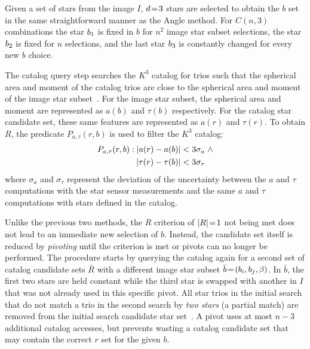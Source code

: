 Given a set of stars from the image $I$, $d \!=\! 3$ stars are selected to obtain the $b$ set in the same
straightforward manner as the Angle method.
For $C(n, 3)$ combinations the star $b_1$ is fixed in $b$ for $n^2$ image star subset selections,
the star $b_2$ is fixed for $n$ selections, and the last star $b_3$ is constantly changed for
every new $b$ choice.

The catalog query step searches the $K^3$ catalog for trios such that the spherical area and moment of the catalog trios
are close to the spherical area and moment of the image star subset~\cite{coleAndCrassidis:sphericalTriangleMethod}.
For the image star subset, the spherical area and moment are represented as $a(b)$ and $\tau(b)$ respectively.
For the catalog star candidate set, these same features are represented as $a(r)$ and $\tau(r)$.
To obtain $R$, the predicate $P_{a, \tau}(r, b)$ is used to filter the $K^3$ catalog:
\begin{equation}
    \begin{aligned}
        P_{a, \tau}(r, b) : \left|  a(r) - a(b) \right| &< 3\sigma_{a}
        \ \land \\ \left| \tau(r) - \tau(b) \right| &< 3\sigma_{\tau}
    \end{aligned}
\end{equation}
where $\sigma_{a}$ and $\sigma_{\tau}$ represent the deviation of the uncertainty between the $a$ and $\tau$
computations with the star sensor measurements and the same $a$ and $\tau$ computations with stars defined in the
catalog.

Unlike the previous two methods, the $R$ criterion of $|R| \!=\! 1$ not being met does not lead to an immediate new
selection of $b$.
Instead, the candidate set itself is reduced by \textit{pivoting} until the criterion is met or pivots can no longer
be performed.
The procedure starts by querying the catalog again for a second set of catalog candidate sets $\bar{R}$ with a
different image star subset $\bar{b} \!=\! \left(b_i, b_j, \beta\right)$.
In $\bar{b}$, the first two stars are held constant while the third star is swapped with another in $I$ that was not
already used in this specific pivot.
All star trios in the initial search that do not match a trio in the second search by \textit{two stars} (a partial
match) are removed from the initial search candidate star set~\cite{coleAndCrassidis:sphericalTriangleMethod}.
A pivot uses at most $n - 3$ additional catalog accesses, but prevents wasting a catalog candidate set that may contain
the correct $r$ set for the given $b$.

